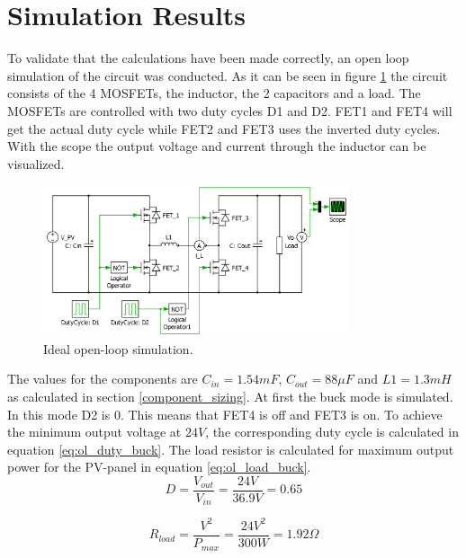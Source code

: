 \section{Simulation Results} \label{opsimresult}

To validate that the calculations have been made correctly, an open loop simulation of the circuit was conducted. As it can be seen in figure \ref{fig:openloop_schematic} the circuit consists of the 4 MOSFETs, the inductor, the 2 capacitors and a load. The MOSFETs are controlled with two duty cycles D1 and D2. FET1 and FET4 will get the actual duty cycle while FET2 and FET3 uses the inverted duty cycles. With the scope the output voltage and current through the inductor can be visualized.

\begin{figure}[H]
	\begin{center}
		\includegraphics[width=0.8\textwidth]{../Pictures/P1/Open_loop_simulation/open_loop_schematic}
		\caption{Ideal open-loop simulation.}
		\label{fig:openloop_schematic}
	\end{center}
\end{figure}
The values for the components are $C_{in}=1.54mF$, $C_{out}=88 \mu F$ and $L1=1.3mH$ as calculated in section \ref{component_sizing}. At first the buck mode is simulated. In this mode D2 is 0. This means that FET4 is off and FET3 is on. To achieve the minimum output voltage at $24V$, the corresponding duty cycle is calculated in equation \ref{eq:ol_duty_buck}. The load resistor is calculated for maximum output power for the PV-panel in equation \ref{eq:ol_load_buck}.
\begin{equation} \label{eq:ol_duty_buck}
	D= \frac{V_{out}}{V_{in}} = \frac{24V}{36.9V} = 0.65
\end{equation}

\begin{equation} \label{eq:ol_load_buck}
	R_{load} = \frac{V^2}{P_{max}} = \frac{24V^2}{300W} = 1.92 \Omega
\end{equation}



